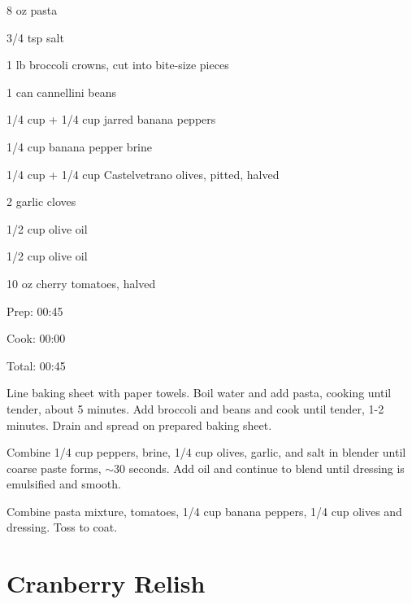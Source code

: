 \documentclass[oneside]{book}  %
\def\thisrecipe{}  %
\newcommand{\recipe}[1]{\section{#1}\def\thisrecipe{: #1}} %
\newcommand{\about}{$\sim$}
\begin{document}
\begin{IT}
  \begin{ingredients}
    \item[8 oz] pasta
    \item[3/4 tsp] salt
    \item[1 lb] broccoli crowns, cut into bite-size pieces
    \item[1 can] cannellini beans
    \item[1/4 cup + 1/4 cup] jarred banana peppers
    \item[1/4 cup] banana pepper brine
    \item[1/4 cup + 1/4 cup] Castelvetrano olives, pitted, halved
    \item[2] garlic cloves
    \item[1/2 cup] olive oil
    \item[1/2 cup] olive oil
    \item[10 oz] cherry tomatoes, halved
  \end{ingredients}

  \switchcolumn

  \begin{timeline}
    \item[Prep:]  00:45
    \item[Cook:]  00:00
    \item[Total:] 00:45
  \end{timeline}
\end{IT}

\begin{directions}
  \item Line baking sheet with paper towels. Boil water and add pasta, cooking
  until tender, about 5 minutes. Add broccoli and beans and cook until tender,
  1-2 minutes. Drain and spread on prepared baking sheet.

  \item Combine 1/4 cup peppers, brine, 1/4 cup olives, garlic, and salt in
  blender until coarse paste forms, \about 30 seconds. Add oil and continue to
  blend until dressing is emulsified and smooth.


  \item Combine pasta mixture, tomatoes, 1/4 cup banana peppers, 1/4 cup olives
  and dressing. Toss to coat.
\end{directions}
\recipe{Cranberry Relish} \label{recipe:cranberry_relish} %
\end{document}
